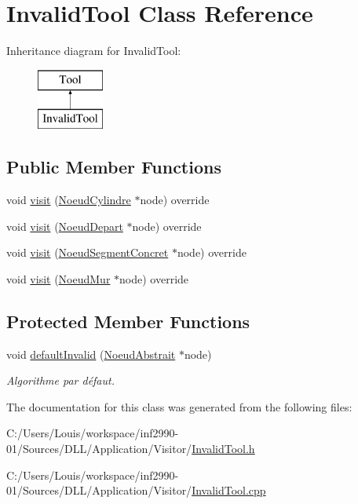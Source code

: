 \hypertarget{class_invalid_tool}{}\section{Invalid\+Tool Class Reference}
\label{class_invalid_tool}
Inheritance diagram for Invalid\+Tool\+:\begin{figure}[H]
\begin{center}
\leavevmode
\includegraphics[height=2.000000cm]{class_invalid_tool}
\end{center}
\end{figure}
\subsection*{Public Member Functions}
\begin{DoxyCompactItemize}
\item 
void \hyperlink{group__inf2990_ga55674ebdcf4c31ced5df732e2424d282}{visit} (\hyperlink{class_noeud_cylindre}{Noeud\+Cylindre} $\ast$node) override
\item 
void \hyperlink{group__inf2990_gabbc70a0da4b0aadac5a37f1fce30cb7a}{visit} (\hyperlink{class_noeud_depart}{Noeud\+Depart} $\ast$node) override
\item 
void \hyperlink{group__inf2990_ga2f8397c63d7f895906f49ab95de03f13}{visit} (\hyperlink{class_noeud_segment_concret}{Noeud\+Segment\+Concret} $\ast$node) override
\item 
void \hyperlink{group__inf2990_gab69a438cb8d2abff211cd450c9f946f5}{visit} (\hyperlink{class_noeud_mur}{Noeud\+Mur} $\ast$node) override
\end{DoxyCompactItemize}
\subsection*{Protected Member Functions}
\begin{DoxyCompactItemize}
\item 
void \hyperlink{group__inf2990_gafb96baa12cb0df8c48c84dd12badd757}{default\+Invalid} (\hyperlink{class_noeud_abstrait}{Noeud\+Abstrait} $\ast$node)
\begin{DoxyCompactList}\small\item\em Algorithme par défaut. \end{DoxyCompactList}\end{DoxyCompactItemize}


The documentation for this class was generated from the following files\+:\begin{DoxyCompactItemize}
\item 
C\+:/\+Users/\+Louis/workspace/inf2990-\/01/\+Sources/\+D\+L\+L/\+Application/\+Visitor/\hyperlink{_invalid_tool_8h}{Invalid\+Tool.\+h}\item 
C\+:/\+Users/\+Louis/workspace/inf2990-\/01/\+Sources/\+D\+L\+L/\+Application/\+Visitor/\hyperlink{_invalid_tool_8cpp}{Invalid\+Tool.\+cpp}\end{DoxyCompactItemize}
